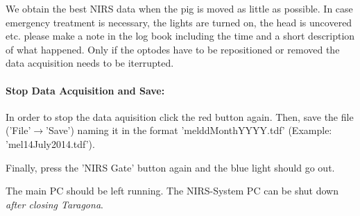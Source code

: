 \documentclass[a4paper, 11pt]{article}
\begin{document}
We obtain the best NIRS data when the pig is moved as little as possible. 
In case emergency treatment is necessary, the lights are turned on, the head is uncovered etc. please make a note in the log book including the time and a short description of what happened.
Only if the optodes have to be repositioned or removed the data acquisition needs to be iterrupted.


\paragraph*{Stop Data Acquisition and Save:} 

In order to stop the data aquisition click the red button again. Then, save the file ('File'$\rightarrow$'Save') naming it in the format 'mel\textunderscore ddMonthYYYY.tdf' (Example: 'mel\textunderscore 14July2014.tdf'). 

Finally, press the 'NIRS Gate' button again and the blue light should go out. 

The main PC should be left running. The NIRS-System PC can be shut down \emph{after closing Taragona}.
\end{document}
